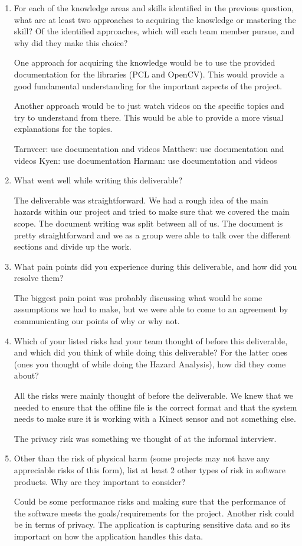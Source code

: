 \begin{enumerate}
\item For each of the knowledge areas and skills identified in the previous question, what are at least two approaches to acquiring the knowledge or mastering the skill?  Of the identified approaches, which
will each team member pursue, and why did they make this choice?

One approach for acquiring the knowledge would be to use the provided documentation for the libraries (PCL and OpenCV). This would provide a good fundamental understanding for the important aspects of the project. 

Another approach would be to just watch videos on the specific topics and try to understand from there. This would be able to provide a more visual explanations for the topics.

Tarnveer: use documentation and videos
Matthew: use documentation and videos 
Kyen: use documentation
Harman: use documentation and videos

\item What went well while writing this deliverable? 

The deliverable was straightforward. We had a rough idea of the main hazards within our project and 
tried to make sure that we covered the main scope. The document writing was split between all of us.
The document is pretty straightforward and we as a group were able to talk over the different sections
and divide up the work.

\item What pain points did you experience during this deliverable, and how
did you resolve them?

The biggest pain point was probably discussing what would be some assumptions we had to make, but we were able to come to an agreement by communicating our points of why or why not.

\item Which of your listed risks had your team thought of before this
deliverable, and which did you think of while doing this deliverable? For
the latter ones (ones you thought of while doing the Hazard Analysis), how
did they come about?

All the risks were mainly thought of before the deliverable. We knew that we needed to ensure that the 
offline file is the correct format and that the system needs to make sure it is working with a Kinect sensor and not something else.

The privacy risk was something we thought of at the informal interview.

\item Other than the risk of physical harm (some projects may not have any
appreciable risks of this form), list at least 2 other types of risk in
software products. Why are they important to consider?

Could be some performance risks and making sure that the performance of the software meets the goals/requirements for the project.
Another risk could be in terms of privacy. The application is capturing sensitive data and so its important on how the application handles this data.

\end{enumerate}